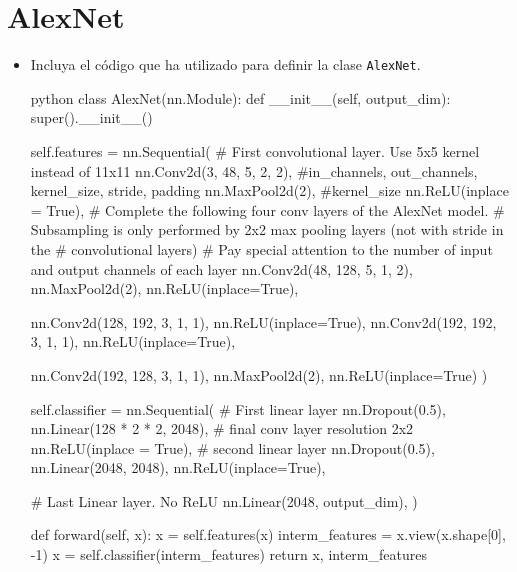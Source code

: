 \documentclass[12pt]{scrartcl}
\begin{document}
\section{AlexNet}
\begin{itemize}
    \item Incluya el código que ha utilizado para definir la clase \texttt{AlexNet}.
    
    
    \begin{mintedbox}{python}
    class AlexNet(nn.Module):
            def __init__(self, output_dim):
                super().__init__()
                
                self.features = nn.Sequential(
                    # First convolutional layer. Use 5x5 kernel instead of 11x11
                    nn.Conv2d(3, 48, 5, 2, 2), #in_channels, out_channels, kernel_size, stride, padding
                    nn.MaxPool2d(2), #kernel_size
                    nn.ReLU(inplace = True),
                    # Complete the following four conv layers of the AlexNet model. 
                    # Subsampling is only performed by 2x2 max pooling layers (not with stride in the 
                    # convolutional layers)
                    # Pay special attention to the number of input and output channels of each layer
                    nn.Conv2d(48, 128, 5, 1, 2),
                    nn.MaxPool2d(2),
                    nn.ReLU(inplace=True),

                    nn.Conv2d(128, 192, 3, 1, 1),
                    nn.ReLU(inplace=True),
                    nn.Conv2d(192, 192, 3, 1, 1),
                    nn.ReLU(inplace=True),

                    nn.Conv2d(192, 128, 3, 1, 1),
                    nn.MaxPool2d(2),
                    nn.ReLU(inplace=True)
                )
                
                self.classifier = nn.Sequential(
                    # First linear layer
                    nn.Dropout(0.5),
                    nn.Linear(128 * 2 * 2, 2048), # final conv layer resolution 2x2
                    nn.ReLU(inplace = True),
                    # second linear layer
                    nn.Dropout(0.5),
                    nn.Linear(2048, 2048),
                    nn.ReLU(inplace=True),
                    
                    # Last Linear layer. No ReLU
                    nn.Linear(2048, output_dim),
                )

            def forward(self, x):
                x = self.features(x)
                interm_features = x.view(x.shape[0], -1)
                x = self.classifier(interm_features)
                return x, interm_features
\end{mintedbox}


\end{itemize}
\end{document}
